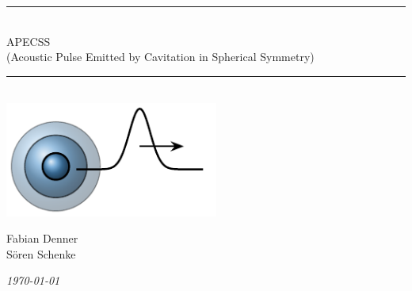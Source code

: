 \documentclass[a4,11pt]{report}
\newcommand{\HRule}{\rule{\linewidth}{0.5mm}}
\newcommand{\thedate}{\today}
\begin{document}
\begin{titlepage}
\begin{center}
\null \vfill
\HRule \\[0.4cm]
{\huge APECSS}\\[0.05cm] {\large (Acoustic Pulse Emitted by Cavitation in Spherical Symmetry)}\\[0.1cm]
\HRule \\[2cm]
\includegraphics[width=7cm]{figures/apecssbubble.pdf}

\vspace{5cm}
Fabian Denner\\
S\"oren Schenke
\vfill

\emph{\thedate}

\end{center}
\end{titlepage}

\tableofcontents 






\cleardoublepage



\end{document}
